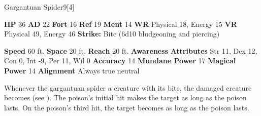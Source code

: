   \begin{monsubsection}{Gargantuan Spider}{9}[4]
    \vspace{-1em}\vspace{-1em}
    \vspace{0em}

    
    

    \begin{spellcontent}
      \begin{spelltargetinginfo}
        \pari \textbf{HP} 36 \monsep
          \textbf{AD} 22 \monsep
          \textbf{Fort} 16 \monsep
          \textbf{Ref} 19 \monsep
          \textbf{Ment} 14
        \pari \textbf{WR} Physical 18, Energy 15 \monsep
        \textbf{VR} Physical 49, Energy 46
        \pari \textbf{Strike:}
            Bite  (6d10 bludgeoning and piercing)
      \end{spelltargetinginfo}
    \end{spellcontent}
    \begin{monsterfooter}
      \pari \textbf{Speed} 60 ft. \monsep
        \textbf{Space} 20 ft. \monsep
        \textbf{Reach} 20 ft.
      \pari \textbf{Awareness} 
      \pari \textbf{Attributes}
        Str 11, Dex 12,
        Con 0, Int -9,
        Per 11, Wil 0
      \pari \textbf{Accuracy} 14 \monsep
        \textbf{Mundane Power} 17 \monsep
      \textbf{Magical Power} 14
      \pari \textbf{Alignment} Always true neutral
    \end{monsterfooter}
  \end{monsubsection}
        Whenever the gargantuan spider  a creature with its bite,
          the damaged creature becomes  (see ).
        The poison's initial hit makes the target  as long as the poison lasts.
        On the poison's third hit, the target becomes  as long as the poison lasts.
  

